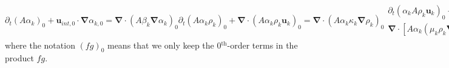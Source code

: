 \documentclass[preprint,10pt]{elsarticle}
\renewcommand{\div}{\mbold{\nabla}\! \cdot \!}
\newcommand{\grad}{\mbold{\nabla}}
\newcommand{\mbold}[1]{\boldsymbol#1}
\newcommand{\norm}{\textrm{norm}}
\renewcommand{\Re}{\textrm{Re}}
\newcommand{\Pe}{\textrm{P\'e}}
\newcommand{\eqt}[1]{Eq.~(\ref{#1})}                     %
\begin{document}
\begin{subequations}
\label{eq:asympt_equ2}
%
\begin{equation}\label{eq:asympt_equ2_vf}
\partial_t \left( A \alpha_k \right)_0  + \mbold u_{int,0} \cdot \grad \alpha_{k,0} = \div \left( A \beta_k \grad \alpha_k \right)_0
\end{equation}
%
\begin{equation}
\label{eq:asympt_equ2_cont}
 \partial_t \left( A \alpha_k \rho_k\right)_0 + \div ( A \alpha_k \rho_k \mbold u_k )_0 = \div (A \alpha_k \kappa_k \grad \rho_k )_0
\end{equation}
%
\begin{align}
\label{eq:asympt_equ2_mom}
\partial_t (\alpha_k A \rho_k \mbold u_k)_0 + \div ( A \alpha_k\rho_k \mbold u_k \otimes \mbold u_k)_0 +A \alpha_k \grad P_{k,2} &= \nonumber \\
\div \left[A \alpha_k \left( \mu_k \rho_k \grad^s \mbold u_k \right. \right. &+ \left. \left. \kappa_k \mbold u_k \otimes \grad \rho_k \right) \right]_0
\end{align}
%
\begin{align}
\label{eq:asympt_equ2_ener}
 \partial_t(A \alpha_k \rho_k E_k)_0 + \div \left[A \alpha_k \mbold u_k (\rho_k E_k + P_k) \right]_0 &= \nonumber \\
 \div \left(A \alpha_k \kappa_k \grad\left(\rho_k e_k\right) \right. &+ \left. A \beta_k \rho_k e_k \grad \alpha_k \right)_0
\end{align}
%
\end{subequations}
%
where the notation $(fg)_0$ means that we only keep the 0$^{\text{th}}$-order terms in the product $fg$. 
%
\end{document}
